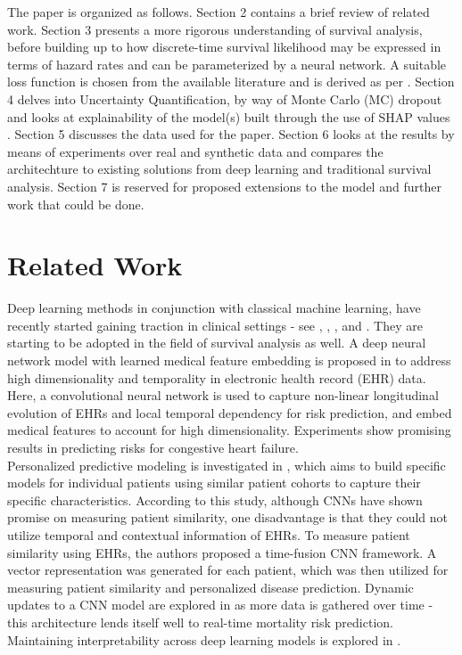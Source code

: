 \documentclass[%
 reprint,
 amsmath,amssymb,
 aps,nofootinbib
]{revtex4-2}
\begin{document}
The paper is organized as follows. Section 2 contains a brief review of related work. Section 3 presents a more rigorous understanding of survival analysis, before building up to how discrete-time survival likelihood may be expressed in terms of hazard rates \cite{Gensheimer_Narasimhan_2019} and can be parameterized by a neural network. A suitable loss function is chosen from the available literature and is derived as per \cite{kvamme_continuous_2019}. Section 4 delves into Uncertainty Quantification, by way of Monte Carlo (MC) dropout \cite{mcdropout} and looks at explainability of the model(s) built through the use of SHAP values \cite{shap}. Section 5 discusses the data used for the paper. Section 6 looks at the results by means of experiments over real and synthetic data and compares the architechture to existing solutions from deep learning and traditional survival analysis. Section 7 is reserved for proposed extensions to the model and further work that could be done.

\section{\label{rescon}Related Work}
Deep learning methods in conjunction with classical machine learning, have recently started gaining traction in clinical settings - see \cite{e2edlgjoreski}, \cite{nirschl2018deep}, \cite{10.1001/jamanetworkopen.2019.6972}, \cite{asolares2020} and \cite{lorenzoni_2019}. They are starting to be adopted in the field of survival analysis as well. A deep neural network model with learned medical feature embedding is proposed in \cite{che2017} to address high dimensionality and temporality in electronic health record (EHR) data. Here, a convolutional neural network is used to capture non-linear longitudinal evolution of EHRs and local temporal dependency for risk prediction, and embed medical features to account for high dimensionality. Experiments show promising results in predicting risks for congestive heart failure.\\

Personalized predictive modeling is investigated in \cite{suo2017personalized}, which aims to build specific models for individual patients using similar patient cohorts to capture their specific characteristics. According to this study, although CNNs have shown promise on measuring patient similarity, one disadvantage is that they could not utilize temporal and contextual information of EHRs. To measure patient similarity using EHRs, the authors proposed a time-fusion CNN framework. A vector representation was generated for each patient, which was then utilized for measuring patient similarity and personalized disease prediction. Dynamic updates to a CNN model are explored in \cite{brand2018real} as more data is gathered over time - this architecture lends itself well to real-time mortality risk prediction. Maintaining interpretability across deep learning models is explored in \cite{caicedo2019iseeu}.\\
\end{document}
